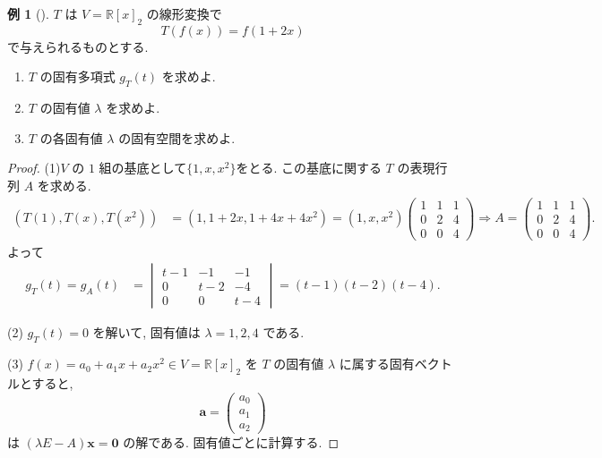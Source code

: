\documentclass[dvipdfmx,a4paper,11pt]{article} %
\theoremstyle{definition}
\newtheorem{eg}[thm]{例}
\begin{document}
\begin{eg}
[{\cite[例題5.3.2]{M}}]
\(T\) は \(V=\mathbb{R}[x]_2\) の線形変換で
\[
T(f(x))=f(1+2x)
\]
で与えられるものとする.
\begin{enumerate}
\item[(1)] \(T\) の固有多項式 \(g_T(t)\) を求めよ.
\item[(2)] \(T\) の固有値 \(\lambda\) を求めよ.
\item[(3)] \(T\) の各固有値 \(\lambda\) の固有空間を求めよ.
\end{enumerate}

\begin{proof}
(1)\(V\) の \(1\) 組の基底として\(\{1,x,x^2\}\)をとる. この基底に関する \(T\) の表現行列 \(A\) を求める.
\[
\begin{aligned}
(T(1),T(x),T(x^2))
&=(1,1+2x,1+4x+4x^2)
=(1,x,x^2)
\begin{pmatrix}
1&1&1\\
0&2&4\\
0&0&4
\end{pmatrix}
\Rightarrow
A=
\begin{pmatrix}
1&1&1\\
0&2&4\\
0&0&4
\end{pmatrix}.
\end{aligned}
\]
よって
\[
\begin{aligned}
g_T(t)
=g_A(t)
&=
\begin{vmatrix}
t-1&-1&-1\\
0&t-2&-4\\
0&0&t-4
\end{vmatrix}
=(t-1)(t-2)(t-4).
\end{aligned}
\]

(2)
\(g_T(t)=0\) を解いて, 固有値は
\(
\lambda=1,2,4
\)
である.

(3)
\(
f(x)=a_0+a_1x+a_2x^2
 \in V=\mathbb{R}[x]_2\)
を \(T\) の固有値 \(\lambda\) に属する固有ベクトルとすると,
\[
\bm{a}=
\begin{pmatrix}
a_0\\
a_1\\
a_2
\end{pmatrix}
\]
は
\(
(\lambda E-A)\bm{x}=\bm{0}
\)
の解である. 固有値ごとに計算する. 


\end{proof}
\end{eg}
\end{document}
